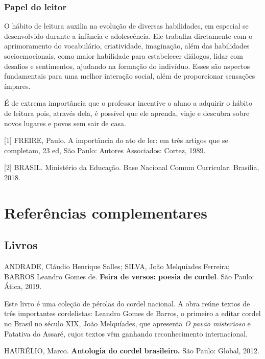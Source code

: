 \documentclass[12pt]{extarticle}
\begin{document}

\subsubsection{{Papel do leitor}}

O hábito de leitura auxilia na evolução de diversas habilidades, em
especial se desenvolvido durante a infância e adolescência. Ele trabalha
diretamente com o aprimoramento do vocabulário, criatividade,
imaginação, além das habilidades socioemocionais, como maior habilidade
para estabelecer diálogos, lidar com desafios e sentimentos, ajudando na
formação do indivíduo. Esses são aspectos fundamentais para uma melhor
interação social, além de proporcionar sensações ímpares.

É de extrema importância que o professor incentive o aluno a adquirir o
hábito de leitura pois, através dela, é possível que ele aprenda, viaje
e descubra sobre novos lugares e povos sem sair de casa.

{[}1{]} FREIRE, Paulo. A importância do ato de ler: em três artigos que
se completam, 23 ed, São Paulo: Autores Associados: Cortez, 1989.

{[}2{]} BRASIL. Ministério da Educação. Base Nacional Comum Curricular.
Brasília, 2018.

\section{Referências complementares}


\subsection{Livros}

  ANDRADE, Cláudio Henrique Salles; SILVA, João Melquíades Ferreira;
  BARROS Leandro Gomes de. \textbf{Feira de versos: poesia de cordel}.
  São Paulo: Ática, 2019.

Este livro é uma coleção de pérolas do cordel nacional. A obra reúne
textos de três importantes cordelistas: Leandro Gomes de Barros, o
primeiro a editar cordel no Brasil no século XIX, João Melquíades, que
apresenta \emph{O pavão misterioso} e Patativa do Assaré, cujos textos
vêm ganhando reconhecimento internacional.


  HAURÉLIO, Marco. \textbf{Antologia do cordel brasileiro.} São Paulo:
  Global, 2012.
\end{document}
